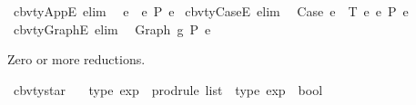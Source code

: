 \begin{isabellebody}
\isamarkupfalse%
\ cbv{\isacharunderscore}{\kern0pt}ty{\isacharunderscore}{\kern0pt}AppE\ {\isacharbrackleft}{\kern0pt}elim{\isacharbang}{\kern0pt}{\isacharbrackright}{\kern0pt}{\isacharcolon}{\kern0pt}\isanewline
\ \ {\isachardoublequoteopen}e{}\ {\isasymcdot}\ e{}\ {\isacharminus}{\kern0pt}{\isachargreater}{\kern0pt}{\isacharbraceleft}{\kern0pt}P{\isacharbraceright}{\kern0pt}\ e{\isachardoublequoteclose}\isanewline
\isanewline
{}\isamarkupfalse%
\ cbv{\isacharunderscore}{\kern0pt}ty{\isacharunderscore}{\kern0pt}CaseE\ {\isacharbrackleft}{\kern0pt}elim{\isacharbang}{\kern0pt}{\isacharbrackright}{\kern0pt}{\isacharcolon}{\kern0pt}\isanewline
\ \ {\isachardoublequoteopen}Case\ e{}\ {\isasymGamma}\ T\ e{}\ e{}\ {\isacharminus}{\kern0pt}{\isachargreater}{\kern0pt}{\isacharbraceleft}{\kern0pt}P{\isacharbraceright}{\kern0pt}\ e{\isachardoublequoteclose}\isanewline
\isanewline
{}\isamarkupfalse%
\ cbv{\isacharunderscore}{\kern0pt}ty{\isacharunderscore}{\kern0pt}GraphE\ {\isacharbrackleft}{\kern0pt}elim{\isacharbang}{\kern0pt}{\isacharbrackright}{\kern0pt}{\isacharcolon}{\kern0pt}\isanewline
\ \ {\isachardoublequoteopen}Graph\ g\ {\isacharminus}{\kern0pt}{\isachargreater}{\kern0pt}{\isacharbraceleft}{\kern0pt}P{\isacharbraceright}{\kern0pt}\ e{\isachardoublequoteclose}%
\begin{isamarkuptext}%
Zero or more reductions.%
\end{isamarkuptext}\isamarkuptrue%
\isamarkupfalse%
\ cbv{\isacharunderscore}{\kern0pt}ty{\isacharunderscore}{\kern0pt}star\ {\isacharcolon}{\kern0pt}{\isacharcolon}{\kern0pt}\isanewline
\ \ {\isachardoublequoteopen}type\ exp\ {\isacharequal}{\kern0pt}{\isachargreater}{\kern0pt}\ prodrule\ list\ {\isacharequal}{\kern0pt}{\isachargreater}{\kern0pt}\ type\ exp\ {\isacharequal}{\kern0pt}{\isachargreater}{\kern0pt}\ bool{\isachardoublequoteclose}\isanewline
\ \ {\isacharparenleft}{\kern0pt}{\isachardoublequoteopen}{\isacharunderscore}{\kern0pt}\ {\isacharminus}{\kern0pt}{\isachargreater}{\kern0pt}{\isacharbraceleft}{\kern0pt}{\isacharunderscore}{\kern0pt}{\isacharbraceright}{\kern0pt}{\isacharasterisk}{\kern0pt}\ {\isacharunderscore}{\kern0pt}{\isachardoublequoteclose}\ {\isacharbrackleft}{\kern0pt}{}{}{\isacharcomma}{\kern0pt}{}{\isacharcomma}{\kern0pt}{}{}{\isacharbrackright}{\kern0pt}\ {}{}{\isacharparenright}{\kern0pt}\isanewline

\end{isabellebody}
